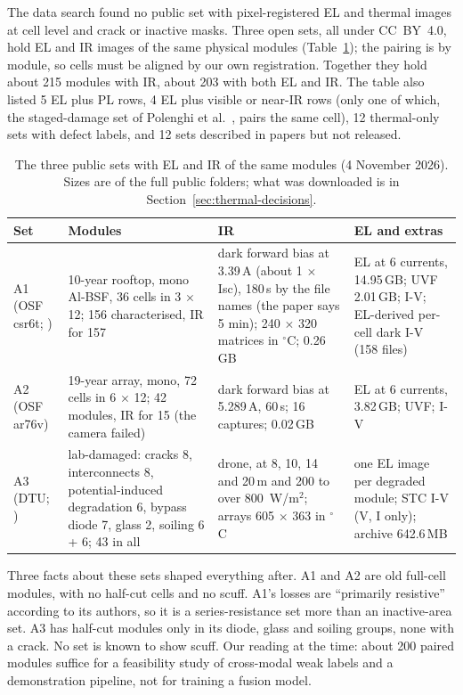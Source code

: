 The data search found no public set with pixel-registered EL and thermal images at cell level and crack or inactive masks. Three
open sets, all under CC~BY~4.0, hold EL and IR images of the same physical modules (Table~\ref{tab:thermal-sets}); the pairing is by
module, so cells must be aligned by our own registration. Together they hold about 215 modules with IR, about 203 with both EL and
IR. The table also listed 5 EL plus PL rows, 4 EL plus visible or near-IR rows (only one of which, the staged-damage set of Polenghi
et al.~\citep{polenghi2026data}, pairs the same cell), 12 thermal-only sets with defect labels, and 12 sets described in papers but not
released.

\begin{table}[htbp]
\centering\small
\caption{The three public sets with EL and IR of the same modules (4 November 2026). Sizes are of the full public folders; what was
downloaded is in Section~\ref{sec:thermal-decisions}.}
\label{tab:thermal-sets}
\begin{tabular}{@{}p{1.9cm}p{3.6cm}p{3.3cm}p{4.2cm}@{}}
\toprule
Set & Modules & IR & EL and extras \\
\midrule
A1 (OSF csr6t; \citet{colvin2023degradation}) &
10-year rooftop, mono Al-BSF, 36 cells in 3 $\times$ 12; 156 characterised, IR for 157 &
dark forward bias at 3.39\,A (about 1 $\times$ Isc), 180\,s by the file names (the paper says 5 min); 240 $\times$ 320 matrices in $^{\circ}$C; 0.26\,GB &
EL at 6 currents, 14.95\,GB; UVF 2.01\,GB; I-V; EL-derived per-cell dark I-V (158 files) \\
A2 (OSF ar76v) & 19-year array, mono, 72 cells in 6 $\times$ 12; 42 modules, IR for 15 (the camera failed) &
dark forward bias at 5.289\,A, 60\,s; 16 captures; 0.02\,GB & EL at 6 currents, 3.82\,GB; UVF; I-V \\
A3 (DTU; \citep{delpradosantamaria2025drone}) & lab-damaged: cracks 8, interconnects 8, potential-induced degradation 6,
bypass diode 7, glass 2, soiling 6 + 6; 43 in all &
drone, at 8, 10, 14 and 20\,m and 200 to over 800~W/m$^2$; arrays 605 $\times$ 363 in $^{\circ}$C &
one EL image per degraded module; STC I-V (V, I only); archive 642.6\,MB \\
\bottomrule
\end{tabular}
\end{table}

Three facts about these sets shaped everything after. A1 and A2 are old full-cell modules, with no half-cut cells and no scuff. A1's
losses are ``primarily resistive'' according to its authors, so it is a series-resistance set more than an inactive-area set. A3 has
half-cut modules only in its diode, glass and soiling groups, none with a crack. No set is known to show scuff. Our reading at the
time: about 200 paired modules suffice for a feasibility study of cross-modal weak labels and a demonstration pipeline, not for
training a fusion model.

